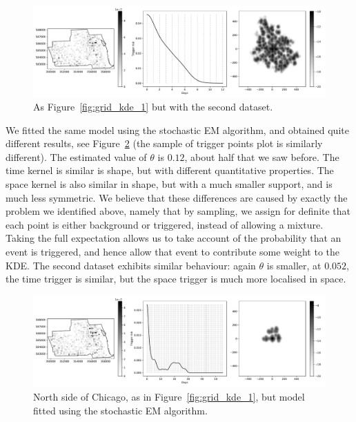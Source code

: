 \documentclass[twoside,a4paper]{article}
\theoremstyle{plain}
\theoremstyle{definition}
\begin{document}
\begin{figure}
  \includegraphics[width=\textwidth]{../notebooks/grid_kde_one_mod.pdf}
  \caption{As Figure~\ref{fig:grid_kde_1} but with the second dataset.}
  \label{fig:grid_kde_1_mod}
\end{figure}

We fitted the same model using the stochastic EM algorithm, and obtained quite different results,
see Figure~\ref{fig:grid_kde_2} (the sample of trigger points plot is similarly different).
The estimated value of $\theta$ is $0.12$, about half that we saw before.  The time kernel is
similar is shape, but with different quantitative properties.  The space kernel is also similar
in shape, but with a much smaller support, and is much less symmetric.
We believe that these differences are caused by
exactly the problem we identified above, namely that by sampling, we assign for definite that
each point is either background or triggered, instead of allowing a mixture.  Taking the full
expectation allows us to take account of the probability that an event is triggered, and hence
allow that event to contribute some weight to the KDE.  The second dataset exhibits
similar behaviour: again $\theta$ is smaller, at $0.052$, the time trigger is similar, but
the space trigger is much more localised in space.

\begin{figure}
  \includegraphics[width=\textwidth]{../notebooks/grid_kde_two.pdf}
  \caption{North side of Chicago, as in Figure~\ref{fig:grid_kde_1}, but model fitted using the
  stochastic EM algorithm.}
  \label{fig:grid_kde_2}
\end{figure}
\end{document}
